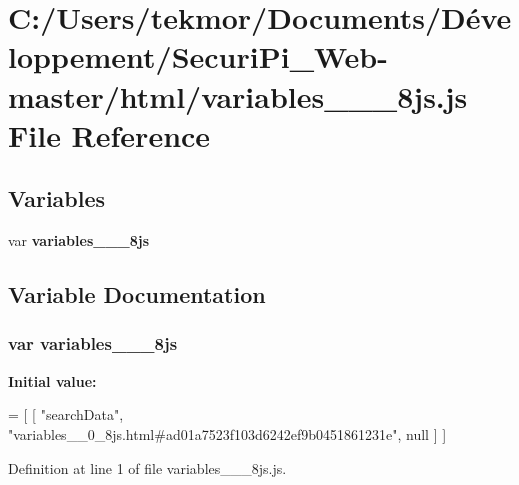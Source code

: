 \section{C\+:/\+Users/tekmor/\+Documents/\+Développement/\+Securi\+Pi\+\_\+\+Web-\/master/html/variables\+\_\+\+\_\+\_\+8js.js File Reference}
\label{variables____0__8js_8js}
\subsection*{Variables}
\begin{DoxyCompactItemize}
\item 
var {\bf variables\+\_\+\+\_\+\_\+8js}
\end{DoxyCompactItemize}


\subsection{Variable Documentation}
\subsubsection[{variables\+\_\+\+\_\+0\+\_\+8js}]{\setlength{\rightskip}{0pt plus 5cm}var variables\+\_\+\+\_\+\_\+8js}\label{variables____0__8js_8js_a246ca50b7cd129db81d690cb7b791a77}
{\bfseries Initial value\+:}
\begin{DoxyCode}
=
[
    [ \textcolor{stringliteral}{"searchData"}, \textcolor{stringliteral}{"variables\_\_0\_8js.html#ad01a7523f103d6242ef9b0451861231e"}, null ]
]
\end{DoxyCode}


Definition at line 1 of file variables\+\_\+\+\_\+\_\+8js.\+js.


